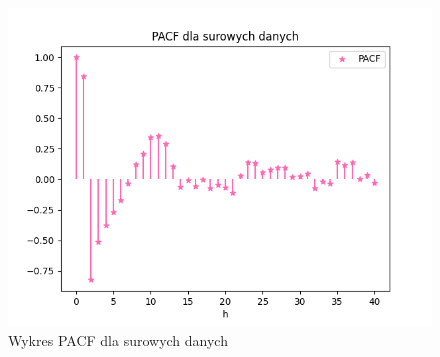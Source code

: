 \documentclass[12pt]{article}
\begin{document}
\begin{figure}[!htbp]
    \centering
    \includegraphics[scale=0.70]{surowe_pacf.png}
    \caption{Wykres PACF dla surowych danych}
    \label{fig:enter-label}
\end{figure}
\\
\end{document}
